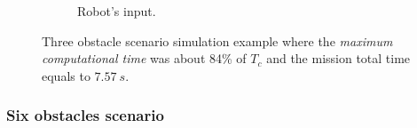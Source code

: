 \begin{figure}[!h]
\begin{subfigure}[b]{0.48\textwidth}
                \caption{Robot's input.}\label{fig:rinput}
        \end{subfigure}
        \caption{Three obstacle scenario simulation example where the \textit{maximum computational time} was about 84\% of $T_c$ and the mission total time equals to $7.57\ s$.}\label{fig:uni3}
\end{figure}

\subsubsection{Six obstacles scenario}


